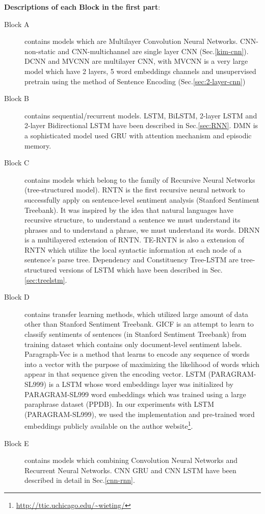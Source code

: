 \textbf{Descriptions of each Block in the first part}:
\begin{description}
\item[Block A] contains models which are Multilayer Convolution Neural Networks.  
CNN-non-static and CNN-multichannel\cite{KimCNN} are single layer CNN (Sec.\ref{kim-cnn}).
DCNN\cite{DCNN} and MVCNN\cite{2-layer-cnn} are multilayer CNN, with MVCNN is a very large model  which have 2 layers, 5 word embeddings channels and unsupervised pretrain using the method of Sentence Encoding (Sec.\ref{sec:2-layer-cnn})
\item[Block B] contains sequential/recurrent models. 
 LSTM\cite{originLSTM}, BiLSTM\cite{GravesLSTM}, 2-layer LSTM\cite{GravesLSTM} and 2-layer Bidirectional LSTM\cite{GravesLSTM} have been described in Sec.\ref{sec:RNN}.
DMN\cite{attention-gru} is a sophisticated model used GRU with attention mechanism and episodic memory.
\item[Block C] contains models which belong to the family of Recursive Neural Networks (tree-structured model). 
RNTN\cite{socher2013recursive} is the first recursive neural network to successfully apply on sentence-level sentiment analysis (Stanford Sentiment Treebank). 
It was inspired by the idea that natural languages have recursive structure, to understand a sentence we must understand its phrases and to understand a phrase, we must understand its words. 
DRNN\cite{IrsoyDRNN} is a multilayered extension of RNTN.
TE-RNTN is also a extension of RNTN which utilize the local syntactic information at each node of a sentence's parse tree.
Dependency and Constituency Tree-LSTM\cite{treeLSTM} are tree-structured versions of LSTM which have been described in Sec.\ref{sec:treelstm}.
 
\item[Block D] contains transfer learning methods, which utilized large amount of data other than Stanford Sentiment Treebank.
GICF\cite{group-instance} is an attempt to learn to classify sentiments of sentences (in Stanford Sentiment Treebank) from training dataset which contains only document-level sentiment labels.
Paragraph-Vec\cite{ParagraphVec} is a method that learns to encode any sequence of words into a vector with the purpose of maximizing the likelihood of words which appear in that sequence given the encoding vector.
LSTM (PARAGRAM-SL999)\cite{wieting2015towards} is a LSTM whose word embeddings layer was initialized by PARAGRAM-SL999 word embeddings which was trained using a large paraphrase dataset (PPDB\cite{ganitkevitch2013ppdb}).
In our experiments with LSTM (PARAGRAM-SL999), we used the implementation and pre-trained word embeddings publicly available on the author website\footnote{\url{http://ttic.uchicago.edu/~wieting/}}.
 
\item[Block E] contains models which combining Convolution Neural Networks and Recurrent Neural Networks. 
CNN GRU and CNN LSTM\cite{cnn-rnn} have been described in detail in Sec.\ref{cnn-rnn}.
\end{description} 

